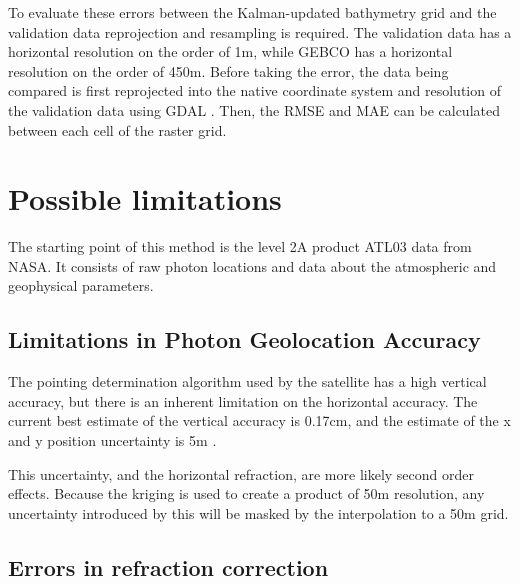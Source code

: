 To evaluate these errors between the Kalman-updated bathymetry grid and the validation data reprojection and resampling is required. The validation data has a horizontal resolution on the order of 1m, while GEBCO has a horizontal resolution on the order of 450m. Before taking the error, the data being compared is first reprojected into the native coordinate system and resolution of the validation data using GDAL \parencite{rouault_even_2022_6352176}. Then, the RMSE and MAE can be calculated between each cell of the raster grid.



\section{Possible limitations}

The starting point of this method is the level 2A product ATL03 data from NASA. It consists of raw photon locations and data about the atmospheric and geophysical parameters. 

\subsection{Limitations in Photon Geolocation Accuracy}

The pointing determination algorithm used by the satellite has a high vertical accuracy, but there is an inherent limitation on the horizontal accuracy. The current best estimate of the vertical accuracy is 0.17cm, and the estimate of the x and y position uncertainty is 5m \parencite{Neumann2019c}.

This uncertainty, and the horizontal refraction, are more likely second order effects. Because the kriging is used to create a product of 50m resolution, any uncertainty introduced by this will be masked by the interpolation to a 50m grid.

\subsection{Errors in refraction correction}

